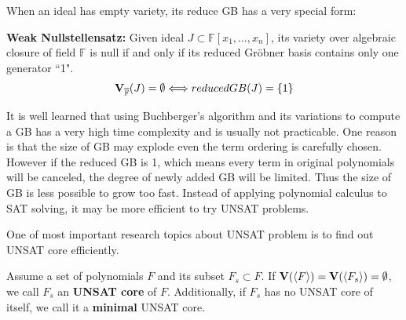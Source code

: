 When an ideal has empty variety, its reduce GB has a very special form:
\begin{Theorem}
{\bf Weak Nullstellensatz:} Given ideal $J\subset \mathbb F[x_1,\dots,x_n]$, its variety over algebraic closure
of field $\mathbb F$ is null if and only if its reduced Gr\"obner basis contains only one generator ``1".
$${\bf V}_{\overline{\mathbb F}}(J) = \emptyset \Longleftrightarrow reducedGB(J) = \{1\}$$
\end{Theorem}

It is well learned that using Buchberger's algorithm and its variations to compute a GB has a very high
time complexity and is usually not practicable. One reason is that the size of GB may explode even the term
ordering is carefully chosen. However if the reduced GB is 1, which means every term in original polynomials
will be canceled, the degree of newly added GB will be limited. Thus the size of GB is less possible to grow 
too fast. Instead of applying polynomial calculus to SAT solving, it may be more efficient to try UNSAT
problems.

One of most important research topics about UNSAT problem is to find out UNSAT core efficiently.
\begin{Definition}
Assume a set of polynomials $F$ and its subset $F_s\subset F$. If ${\bf V}(\langle F\rangle) = {\bf V}
(\langle F_s\rangle) = \emptyset$, we call $F_s$ an {\bf UNSAT core} of $F$. Additionally, if
$F_s$ has no UNSAT core of itself, we call it a {\bf minimal} UNSAT core.
\end{Definition}

